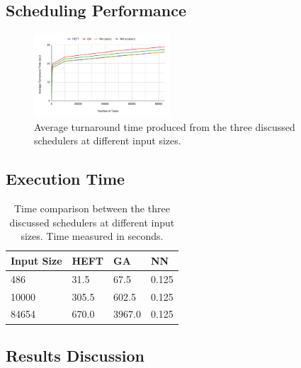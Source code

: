 \subsection{Scheduling Performance}

\begin{figure}[hp]
    \centering
    \includegraphics[width=0.45\textwidth]{diagrams/ta_chart}
    \caption{Average turnaround time produced from the three discussed schedulers at different input sizes.}
    \label{fig:ta_chart}
\end{figure}

\subsection{Execution Time}

\begin{table}
  \caption{Time comparison between the three discussed schedulers at different input sizes. Time measured in seconds.}
  \label{tab:exec_time}
  \centering
  \begin{tabular}{l l l l}
    \toprule
    Input Size & HEFT & GA & NN \\
    \midrule
    486	& 31.5 & 67.5 & 0.125 \\
    10000 & 305.5 & 602.5 & 0.125 \\
    84654 & 670.0 & 3967.0 & 0.125 \\
    \bottomrule
  \end{tabular}
\end{table}

\subsection{Results Discussion}
